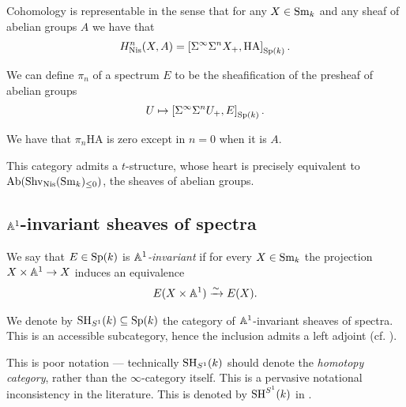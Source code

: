 \documentclass[11pt,openany]{book}
\providecommand{\HA}{\mathrm{HA}}
\begin{document}
\begin{proposition}\label{prop:cohom-representable-in-sheaves-of-spectra} 
Cohomology is representable in the sense that for any $X \in \mathrm{Sm}_k$ and any sheaf of abelian groups $A$ we have that
\begin{align*}
    H^n_\Nis(X,A) = \left[ \Sigma^\infty \Sigma^n X_+, \HA \right]_{\Sp(k)}.
\end{align*}
\end{proposition}


We can define $\pi_n$ of a spectrum $E$ to be the sheafification of the presheaf of abelian groups
\begin{align*}
    U \mapsto \left[ \Sigma^\infty \Sigma^n U_+, E \right]_{\mathrm{Sp}(k)}.
\end{align*}
%

\begin{example} We have that $\pi_n \HA$ is zero except in $n=0$ when it is $A$.
\end{example}

\begin{remark} This category admits a $t$-structure, whose heart is precisely equivalent to $\mathrm{Ab}(\mathrm{Shv}_{\mathrm{Nis}}(\mathrm{Sm}_k)_{\le 0})$, the sheaves of abelian groups.
\end{remark}


\subsection{$\mathbb{A}^1$-invariant sheaves of spectra}

\begin{definition} We say that $E \in \mathrm{Sp}(k)$ is $\mathbb{A}^1$\textit{-invariant} if for every $X \in \mathrm{Sm}_k$ the projection $X \times \mathbb{A}^1 \to X$ induces an equivalence
\begin{align*}
    E(X \times \mathbb{A}^1) \xrightarrow{\sim} E(X).
\end{align*}
\end{definition}

\begin{proposition} We denote by $\mathrm{SH}_{S^1}(k) \subseteq \mathrm{Sp}(k)$ the category of $\mathbb{A}^1$-invariant sheaves of spectra. This is an accessible subcategory, hence the inclusion admits a left adjoint (cf. \cite[4.2.1]{Morel-connectivity}).
\end{proposition}

\begin{remark} This is poor notation --- technically $\mathrm{SH}_{S^1}(k)$ should denote the \textit{homotopy category}, rather than the $\infty$-category itself. This is a pervasive notational inconsistency in the literature. This is denoted by $\mathrm{SH}^{S^1}(k)$ in \cite[3.2.1]{Morel-pi0}.
\end{remark}
\end{document}
